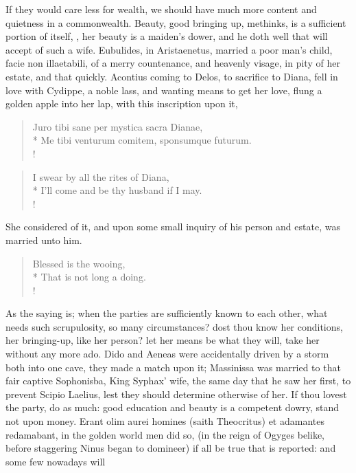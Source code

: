 If they would care less for wealth, we should have much more content
and quietness in a commonwealth. Beauty, good bringing up, methinks, is
a sufficient portion of itself, , her
beauty is a maiden's dower, and he doth well that will accept of such a
wife. Eubulides, in Aristaenetus, married a poor man's child,
facie non illaetabili, of a merry countenance, and heavenly visage, in
pity of her estate, and that quickly. Acontius coming to Delos, to
sacrifice to Diana, fell in love with Cydippe, a noble lass, and
wanting means to get her love, flung a golden apple into her lap, with
this inscription upon it,
%
\begin{latin}
\begin{verse}
Juro tibi sane per mystica sacra Dianae,\\*
Me tibi venturum comitem, sponsumque futurum.\\!
\end{verse}
\end{latin}
\translationrule
\begin{verse}
I swear by all the rites of Diana,\\*
I'll come and be thy husband if I may.\\!
\end{verse}
%
She considered of it, and upon some small inquiry of his person and
estate, was married unto him.
%
\begin{verse}
Blessed is the wooing,\\*
That is not long a doing.\\!
\end{verse}
%
As the saying is; when the parties are sufficiently known to each
other, what needs such scrupulosity, so many circumstances? dost thou
know her conditions, her bringing-up, like her person? let her means be
what they will, take her without any more ado. Dido and Aeneas
were accidentally driven by a storm both into one cave, they made a
match upon it; Massinissa was married to that fair captive Sophonisba,
King Syphax' wife, the same day that he saw her first, to prevent
Scipio Laelius, lest they should determine otherwise of her. If thou
lovest the party, do as much: good education and beauty is a competent
dowry, stand not upon money. Erant olim aurei homines (saith
Theocritus) et adamantes redamabant, in the golden world men did so,
(in the reign of Ogyges belike, before staggering Ninus began to
domineer) if all be true that is reported: and some few nowadays will
